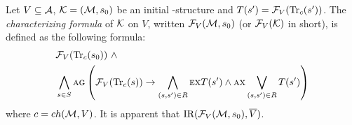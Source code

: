 \documentclass[letterpaper]{article} %
\begin{document}
Let $V\subseteq\cal A$,
 ${\cal K}=({\cal M},s_0)$ be an initial \MPK-structure and $T(s') = {\cal F}_V(\textrm{Tr}_c(s'))$.
The {\em characterizing formula} of $\cal K$ on $V$, written ${\cal F}_V({\cal M},s_0)$ (or ${\cal F}_V({\cal K})$ in short), is
defined as the following formula:
\begin{align*}
  &{\cal F}_V(\textrm{Tr}_c(s_0)) \text{ } \wedge \\
  & \bigwedge_{s\in S}\textsc{a} \textsc{g}\left(
    {\cal F}_V(\textrm{Tr}_c(s)) \rightarrow
    \bigwedge_{(s,s')\in R}
        \textsc{e} \textsc{x} T(s')
        \wedge
        \textsc{a} \textsc{x} \bigvee_{(s,s')\in R}T(s')
    \right)
\end{align*}
where $c=ch({\cal M},V)$. It is apparent that $\textrm{IR}({\cal F}_V({\cal M}, s_0), \overline V)$.
\end{document}
